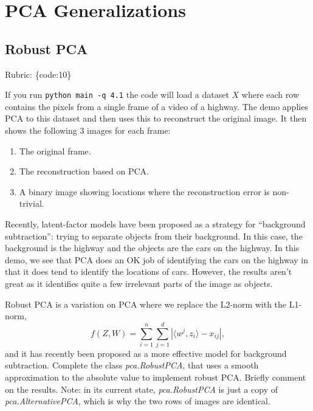 \documentclass{article}
\def\rubric#1{\gre{Rubric: \{#1\}}}{}
\def\blu#1{{\color{blu}#1}}
\def\gre#1{{\color{gre}#1}}
\def\enum#1{\begin{enumerate}#1\end{enumerate}}
\begin{document}
\section{PCA Generalizations}

\subsection{Robust PCA}
\rubric{code:10}

If you run \verb|python main -q 4.1| the code will load a dataset $X$ where each row contains the pixels from a single frame of a video of a highway. The demo applies PCA to this dataset and then uses this to reconstruct the original image.
It then shows the following 3 images for each frame:
\enum{
\item The original frame.
\item The reconstruction based on PCA.
\item A binary image showing locations where the reconstruction error is non-trivial.
}
Recently, latent-factor models have been proposed as a strategy for ``background subtraction'': trying to separate objects from their background. In this case, the background is the highway and the objects are the cars on the highway. In this demo, we see that PCA does an OK job of identifying the cars on the highway in that it does tend to identify the locations of cars. However, the results aren't great as it identifies quite a few irrelevant parts of the image as objects.

Robust PCA is a variation on PCA where we replace the L2-norm with the L1-norm,
\[
f(Z,W) = \sum_{i=1}^n\sum_{j=1}^d |\langle w^j, z_i\rangle - x_{ij}|,
\]
and it has recently been proposed as a more effective model for background subtraction. \blu{Complete the class \emph{pca.RobustPCA},
that uses a smooth approximation to the absolute value to implement robust PCA. Briefly comment on the results.} 
Note: in its current state, \emph{pca.RobustPCA} is just a copy of \emph{pca.AlternativePCA}, which is why the two rows of images are identical.
\end{document}
